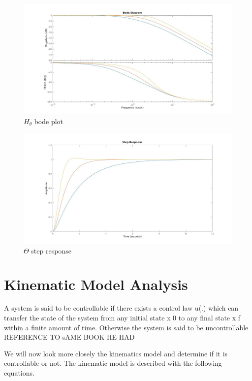 \begin{figure} 
\centering
 	\includegraphics[width=1\textwidth]{figures/Hthetabode.jpg}
	
	
	\caption{$H_{\theta}$ bode plot} 
 	\label{fig:hthetabode} 
\end{figure}

\begin{figure} 
\centering
 	\includegraphics[width=1\textwidth]{figures/thetastep.jpg}
	
	
	\caption{$\Theta$ step response} 
 	\label{fig:thetastep} 
\end{figure}

\section{Kinematic Model Analysis}

A system is said to be controllable if there exists a control law u(.) which can
transfer the state of the system from any initial state x 0 to any final state x f within
a finite amount of time. Otherwise the system is said to be uncontrollable {\color{red} REFERENCE TO sAME BOOK HE HAD}

We will now look more closely the kinematics model and determine if it is controllable or not. The kinematic model is described with the following equations.

